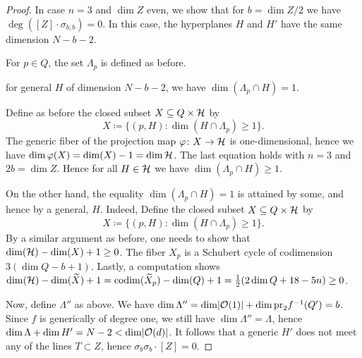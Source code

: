 \begin{proof}
	In case $n=3$ and $\dim Z$ even, we show that for $b=\dim Z/2$ we have
	$\deg ([Z]\cdot \sigma_{b,b})=0$. In this case, the hyperplanes $H$ and $H'$ have the same dimension $N-b-2$.

	For $p\in Q$, the set $\Lambda_p$ is defined as before.

	\begin{claim} for general $H$ of dimension $N-b-2$, we have
	$\dim(\Lambda_p\cap H)=1$. \end{claim}

	\begin{subproof}
	Define as before the closed subset $X\subseteq Q\times \mathcal{H}$ by
	$$X\coloneqq \{(p,H):\dim(H\cap \Lambda_p)\geq 1\}.$$
	The generic fiber of the projection map $\varphi\colon X\to \mathcal{H}$ is one-dimensional, hence we have
	$\dim \varphi(X) = \dim(X)-1 = \dim \mathcal{H}$. The last equation holds with $n=3$ and $2b=\dim Z$. Hence for all $H\in \mathcal{H}$ we have $\dim (\Lambda_p \cap H)\geq 1$.

	On the other hand, the equality $\dim(\Lambda_p \cap H)=1$ is attained by some, and hence by a general, $H$. Indeed, Define the closed subset $X\subseteq Q\times \mathcal{H}$ by
	$$X\coloneqq \{(p,H):\dim(H\cap \Lambda_p)\geq 1\}.$$
	By a similar argument as before, one needs to show that
	$\dim(\mathcal{H})-\dim(X) + 1\geq 0$. The fiber $X_p$ is a Schubert cycle of codimension
	$3(\dim Q-b+1)$. Lastly, a computation shows
	$\dim(\mathcal{H})-\dim(\widetilde X)+1=\operatorname{codim}(\widetilde X_p)-\dim(Q)+1=\frac{1}{2}(2\dim Q + 18 - 5n)\geq 0$. \end{subproof}

	Now, define $\Lambda''$ as above. We have
	$\dim \Lambda''
	= \dim \lvert\mathcal{O}(1)\rvert + \dim \mathrm{pr}_2 f^{-1}(Q')
	= b$.
	Since $f$ is generically of degree one, we still have $\dim \Lambda'' = \Lambda$, hence $\dim \Lambda + \dim H' = N-2 < \dim \lvert\mathcal{O}(d)\rvert$. It follows that a generic $H'$ does not meet any of the lines $T\subset Z$, hence $\sigma_{b}\sigma_{b}\cdot [Z] = 0$.

\end{proof}